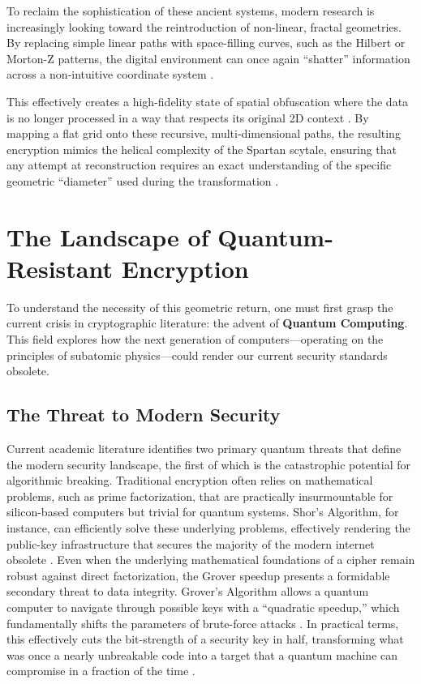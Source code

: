 \documentclass[12pt,fleqn]{article}
\begin{document}
To reclaim the sophistication of these ancient systems, modern research is increasingly looking toward the reintroduction of non-linear, fractal geometries. By replacing simple linear paths with space-filling curves, such as the Hilbert or Morton-Z patterns, the digital environment can once again ``shatter'' information across a non-intuitive coordinate system \cite{moon2001analysis}. 

This effectively creates a high-fidelity state of spatial obfuscation where the data is no longer processed in a way that respects its original 2D context \cite{quinqueton1981peano}. By mapping a flat grid onto these recursive, multi-dimensional paths, the resulting encryption mimics the helical complexity of the Spartan scytale, ensuring that any attempt at reconstruction requires an exact understanding of the specific geometric ``diameter'' used during the transformation \cite{reiss2014geometric}.

\section{The Landscape of Quantum-Resistant Encryption}

To understand the necessity of this geometric return, one must first grasp the current crisis in cryptographic literature: the advent of \textbf{Quantum Computing}. This field explores how the next generation of computers---operating on the principles of subatomic physics---could render our current security standards obsolete.

\subsection{The Threat to Modern Security}

Current academic literature identifies two primary quantum threats that define the modern security landscape, the first of which is the catastrophic potential for algorithmic breaking. Traditional encryption often relies on mathematical problems, such as prime factorization, that are practically insurmountable for silicon-based computers but trivial for quantum systems. Shor's Algorithm, for instance, can efficiently solve these underlying problems, effectively rendering the public-key infrastructure that secures the majority of the modern internet obsolete \cite{shor1994algorithms}. Even when the underlying mathematical foundations of a cipher remain robust against direct factorization, the Grover speedup presents a formidable secondary threat to data integrity. Grover's Algorithm allows a quantum computer to navigate through possible keys with a ``quadratic speedup,'' which fundamentally shifts the parameters of brute-force attacks \cite{grover1996fast}. In practical terms, this effectively cuts the bit-strength of a security key in half, transforming what was once a nearly unbreakable code into a target that a quantum machine can compromise in a fraction of the time \cite{bennett1997strengths}.
\end{document}
